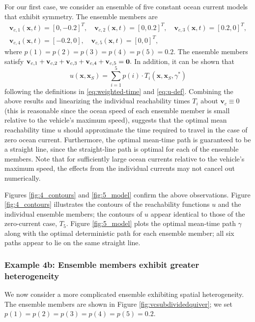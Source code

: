 \documentclass[pdflatex,sn-mathphys-num]{sn-jnl}%
\def \bx{{\mathbf {x}}}
\def \bv{{\mathbf {v}}}
\theoremstyle{thmstyleone}%
\theoremstyle{thmstyletwo}%
\theoremstyle{thmstylethree}%
\begin{document}
For our first case, we consider an ensemble of five constant ocean current models that exhibit symmetry.  The ensemble members are 
\begin{multline*}
\bv_{c,1}(\bx,t)=[0, -0.2]^T, \quad
\bv_{c,2}(\bx,t)=[0,0.2]^T, \quad  
\bv_{c,3}(\bx,t)=[0.2,0]^T, \\
\bv_{c,4}(\bx,t)=[-0.2,  0], \quad
\bv_{c,5}(\bx,t)=[0,0]^T,
\end{multline*}
where $p(1)=p(2)=p(3)=p(4)=p(5)=0.2$.  
The ensemble members satisfy 
$\bv_{c,1}+\bv_{c,2}+\bv_{c,3}+\bv_{c,4}+\bv_{c,5} = \bf{0}.$
In addition, it can be shown that
$$
u(\bx,\bx_S) = \sum _{i=1}^5 p(i)\cdot T_i(\bx,\bx_S,\gamma^*)
$$
following the definitions in \eqref{eq:weighted-time} and \eqref{eq:u-def}.  Combining the above results and linearizing the individual reachability times $T_i$ about $\bv_c \equiv 0$ (this is reasonable since the ocean speed of each ensemble member is small relative to the vehicle's maximum speed), suggests that the optimal mean reachability time $u$ should approximate the time required to travel in the case of zero ocean current.  Furthermore, the optimal mean-time path is guaranteed to be a straight line, since the straight-line path is optimal for each of the ensemble members.  Note that for sufficiently large ocean currents relative to the vehicle's maximum speed, the effects from the individual currents may not cancel out numerically.

Figures \ref{fig:4_contours} and \ref{fig:5_model} confirm the above observations.  Figure  \ref{fig:4_contours} illustrates the contours of the reachability functions $u$ and the individual ensemble members; the contours of $u$ appear identical to those of the zero-current case, $T_5$.  Figure \ref{fig:5_model} plots the optimal mean-time path $\gamma$ along with the optimal deterministic path for each ensemble member; all six paths appear to lie on the same straight line.  




\subsubsection{Example 4b: Ensemble members exhibit greater heterogeneity}

We now consider a more complicated ensemble exhibiting spatial heterogeneity.  The ensemble members are shown in Figure \ref{fig:vcsubdividedquiver}; we set $p(1)=p(2)=p(3)=p(4)=p(5)=0.2$.
\end{document}
